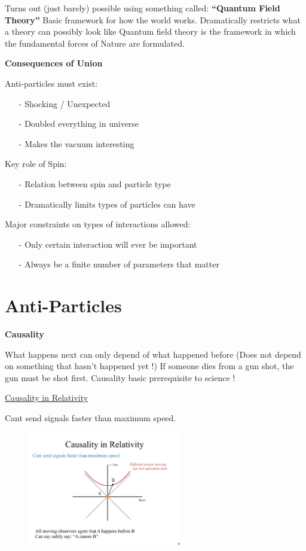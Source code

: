Turns out (just barely) possible using something called: \textbf{``Quantum Field Theory'' }
Basic framework for how the world works.
Dramatically restricts what a theory can possibly look like
Quantum field theory is the framework in which the fundamental forces of Nature are formulated.

\textbf{Consequences of Union}

Anti-particles must exist:
\begin{itemize}
\item[-] Shocking / Unexpected
\item[-] Doubled everything in universe 
\item[-] Makes the vacuum interesting
\end{itemize}

Key role of Spin:
\begin{itemize}
\item[-] Relation between spin and particle type
\item[-] Dramatically limits types of particles can have
\end{itemize}

Major constraints on types of interactions allowed:
\begin{itemize}
\item[-] Only certain interaction will ever be important
\item[-] Always be a finite number of parameters that matter
\end{itemize}

\section{Anti-Particles}
\textbf{Causality}

What happens next can only depend of what happened before
(Does not depend on something that hasn't happened yet !)
If someone dies from a gun shot, the gun must be shot first.
Causality basic prerequisite to science !

\underline{Causality in Relativity}

Cant send signals faster than maximum speed.
\begin{figure}[h]
\centering
\includegraphics[width=0.6\textwidth]{./CausalityTimelike.pdf}
\end{figure}

